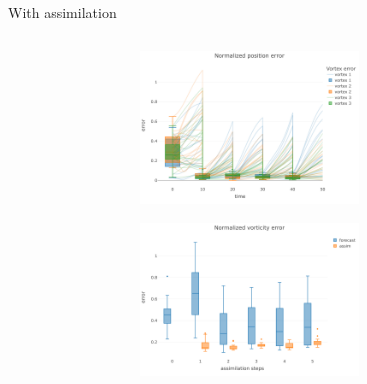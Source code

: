 \documentclass[aspectratio=169]{beamer} %
\begin{document}
\begin{frame}{With assimilation}
    \vspace{-0.5cm}
    \begin{columns}
        \begin{column}{0.5\textwidth}
            \begin{figure}
                \centering
            \end{figure}
        \end{column}
        \begin{column}{0.5\textwidth}
            \begin{figure}
                \centering
                \begin{subfigure}{\textwidth}
                    \centering
                    \includegraphics[width=0.75\textwidth]{images/error_position_w_assim.pdf}
                \end{subfigure}
                \begin{subfigure}{\textwidth}
                    \centering
                    \includegraphics[width=0.75\textwidth]{images/error_vorticity_w_assim.pdf}
                \end{subfigure}
            \end{figure}
        \end{column}
    \end{columns}
\end{frame}
\end{document}
